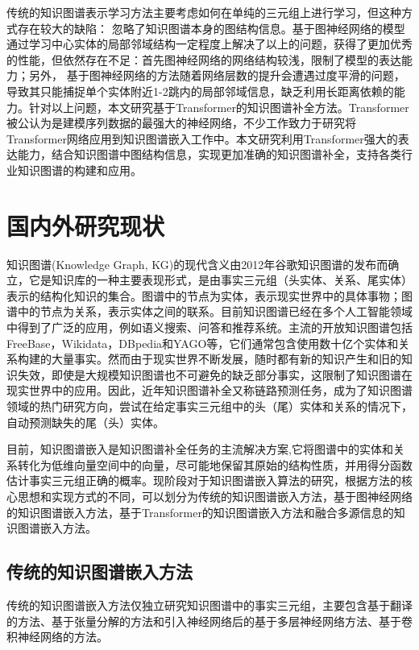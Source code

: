 传统的知识图谱表示学习方法主要考虑如何在单纯的三元组上进行学习，但这种方式存在较大的缺陷：
忽略了知识图谱本身的图结构信息。基于图神经网络的模型通过学习中心实体的局部邻域结构一定程度上解决了以上的问题，获得了更加优秀的性能，但依然存在不足：首先图神经网络的网络结构较浅，限制了模型的表达能力；另外，
基于图神经网络的方法随着网络层数的提升会遭遇过度平滑的问题，导致其只能捕捉单个实体附近1-2跳内的局部邻域信息，缺乏利用长距离依赖的能力。针对以上问题，本文研究基于Transformer的知识图谱补全方法。Transformer被公认为是建模序列数据的最强大的神经网络，不少工作致力于研究将Transformer网络应用到知识图谱嵌入工作中。本文研究利用Transformer强大的表达能力，结合知识图谱中图结构信息，实现更加准确的知识图谱补全，支持各类行业知识图谱的构建和应用。


\section{国内外研究现状}
知识图谱(Knowledge Graph, KG)的现代含义由2012年谷歌知识图谱的发布而确立，它是知识库的一种主要表现形式，是由事实三元组（头实体、关系、尾实体）表示的结构化知识的集合。图谱中的节点为实体，表示现实世界中的具体事物；图谱中的节点为关系，表示实体之间的联系。目前知识图谱已经在多个人工智能领域中得到了广泛的应用，例如语义搜索、问答和推荐系统。主流的开放知识图谱包括FreeBase，Wikidata，DBpedia和YAGO等，它们通常包含使用数十亿个实体和关系构建的大量事实。然而由于现实世界不断发展，随时都有新的知识产生和旧的知识失效，即使是大规模知识图谱也不可避免的缺乏部分事实，这限制了知识图谱在现实世界中的应用。因此，近年知识图谱补全又称链路预测任务，成为了知识图谱领域的热门研究方向，尝试在给定事实三元组中的头（尾）实体和关系的情况下，自动预测缺失的尾（头）实体。

目前，知识图谱嵌入是知识图谱补全任务的主流解决方案,它将图谱中的实体和关系转化为低维向量空间中的向量，尽可能地保留其原始的结构性质，并用得分函数估计事实三元组正确的概率。现阶段对于知识图谱嵌入算法的研究，根据方法的核心思想和实现方式的不同，可以划分为传统的知识图谱嵌入方法，基于图神经网络的知识图谱嵌入方法，基于Transformer的知识图谱嵌入方法和融合多源信息的知识图谱嵌入方法。
\subsection{传统的知识图谱嵌入方法}
传统的知识图谱嵌入方法仅独立研究知识图谱中的事实三元组，主要包含基于翻译的方法、基于张量分解的方法和引入神经网络后的基于多层神经网络方法、基于卷积神经网络的方法。

